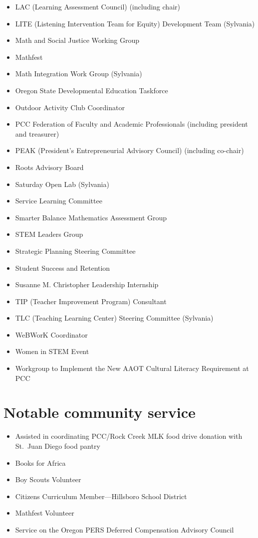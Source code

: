 \begin{itemize}[label={}]
\item LAC (Learning Assessment Council) (including chair)
\item LITE (Listening Intervention Team for Equity) Development Team (Sylvania)
\item Math and Social Justice Working Group
\item Mathfest
\item Math Integration Work Group (Sylvania)
\item Oregon State Developmental Education Taskforce
\item Outdoor Activity Club Coordinator
\item PCC Federation of Faculty and Academic Professionals (including president and treasurer)
\item PEAK (President's Entrepreneurial Advisory Council) (including co-chair)
\item Roots Advisory Board
\item Saturday Open Lab (Sylvania)
\item Service Learning Committee
\item Smarter Balance Mathematics Assessment Group
\item STEM Leaders Group
\item Strategic Planning Steering Committee
\item Student Success and Retention
\item Susanne M. Christopher Leadership Internship
\item TIP (Teacher Improvement Program) Consultant
\item TLC (Teaching Learning Center) Steering Committee (Sylvania)
\item WeBWorK Coordinator
\item Women in STEM Event
\item Workgroup to Implement the New AAOT Cultural Literacy Requirement at PCC
\end{itemize}

\section*{Notable community service}

\begin{itemize}
\item Assisted in coordinating PCC/Rock Creek MLK food drive donation with St.\ Juan Diego food pantry
\item Books for Africa
\item Boy Scouts Volunteer
\item Citizens Curriculum Member---Hillsboro School District
\item Mathfest Volunteer
\item Service on the Oregon PERS Deferred Compensation Advisory Council
\end{itemize}

